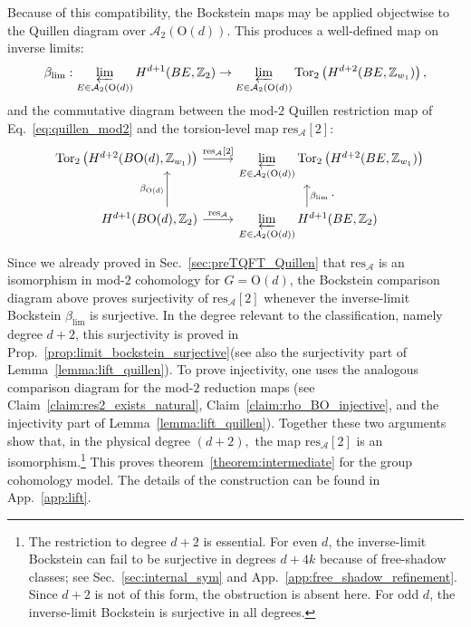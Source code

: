 \documentclass[aps,prx,reprint,superscriptaddress,twocolumn,amsmath,amssymb,amsfonts, nofootinbib]{revtex4-2}
\newcommand{\qa}{\mathcal{A}_{2}}
\newcommand{\res}{\text{res}}
\newcommand{\tor}{\text{Tor}}
\newcommand{\Z}{\mathbb{Z}}
\theoremstyle{apsstyle}
\begin{document}
{Because of this compatibility, the Bockstein maps may be applied objectwise to the Quillen diagram over $\qa(\mathrm{O}(d))$. This produces a well-defined map on inverse limits:
\begin{equation}
\label{eq:limit_Bockstein}
    \beta_{\lim}: \varprojlim\limits_{E\in\mathcal A_{2}(\mathrm{O}(d))} H^{d+1}(BE,\mathbb Z_{2}) \to \varprojlim\limits_{E\in \qa(\mathrm{O}(d))} \tor_2\left(H^{d+2}(BE, \Z_{w_{1}})\right),
\end{equation}
and the commutative diagram between the mod-$2$ Quillen restriction map of Eq.~\ref{eq:quillen_mod2} and the torsion-level map $\res_{\mathcal A}[2]$:
\begin{equation*}
\begin{tikzcd}
\mathllap{\tor_2\left(H^{d+2}(B\mathrm{O}(d), \Z_{w_{1}})\right)}
\arrow[r, "\res_{\mathcal{A}}\text{[}2\text{]}"] &  \mathrlap{\varprojlim\limits_{E\in \qa(\mathrm{O}(d))} \tor_2\left(H^{d+2}(BE, \Z_{w_{1}})\right)} \\
\mathllap{H^{d+1}(B\mathrm{O}(d),\mathbb Z_{2})} \arrow[u, "\beta_{\mathrm{O}(d)}", shift left=24pt] \arrow[r, "\res_{\mathcal{A}}"]
  &\mathrlap{\varprojlim\limits_{E\in\mathcal A_{2}(\mathrm{O}(d))} H^{d+1}(BE,\mathbb Z_{2})} \arrow[u, "\beta_{\lim}", swap, shift right=54pt]
\end{tikzcd}.
\end{equation*}
Since we already proved in Sec.~\ref{sec:preTQFT_Quillen} that $\res_{\mathcal A}$ is an isomorphism in mod-$2$ cohomology for $G=\mathrm{O}(d)$, the Bockstein comparison diagram above proves surjectivity of $\res_{\mathcal A}[2]$ whenever the inverse-limit Bockstein $\beta_{\lim}$ is surjective. In the degree relevant to the classification, namely degree $d+2$, this surjectivity is proved in Prop.~\ref{prop:limit_bockstein_surjective}(see also the surjectivity part of Lemma~\ref{lemma:lift_quillen}). 
To prove injectivity, one uses the analogous comparison diagram for the mod-$2$ reduction maps (see Claim~\ref{claim:res2_exists_natural}, Claim~\ref{claim:rho_BO_injective}, and the injectivity part of Lemma~\ref{lemma:lift_quillen}). Together these two arguments show that, in the physical degree $(d+2),$ the map $\res_{\mathcal{A}}[2]$ is an isomorphism.\footnote{The restriction to degree $d+2$ is essential. For even $d$, the inverse-limit Bockstein can fail to be surjective in degrees $d+4k$ because of free-shadow classes; see Sec.~\ref{sec:internal_sym} and App.~\ref{app:free_shadow_refinement}. Since $d+2$ is not of this form, the obstruction is absent here. For odd $d$, the inverse-limit Bockstein is surjective in all degrees.} This proves theorem~\ref{theorem:intermediate} for the group cohomology model. The details of the construction can be found in App.~\ref{app:lift}.



}
\end{document}
